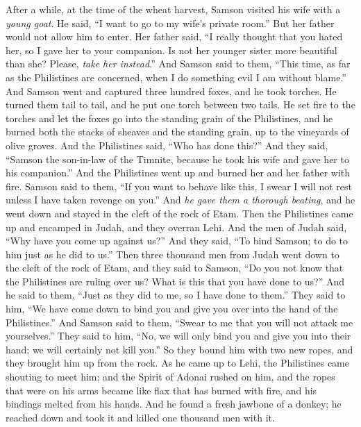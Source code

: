 \begin{biblechapter} %
 After a while, at the time of the wheat harvest, Samson visited his wife with a \textit{young goat}. He said, “I want to go to my wife’s private room.” But her father would not allow him to enter.
\verse Her father said, “I really thought that you hated her, so I gave her to your companion. Is not her younger sister more beautiful than she? Please, \textit{take her instead}.”
\verse And Samson said to them, “This time, as far as the Philistines are concerned, when I do something evil I am without blame.”
\verse And Samson went and captured three hundred foxes, and he took torches. He turned them tail to tail, and he put one torch between two tails.
\verse He set fire to the torches and let the foxes go into the standing grain of the Philistines, and he burned both the stacks of sheaves and the standing grain, up to the vineyards of olive groves.
\verse And the Philistines said, “Who has done this?” And they said, “Samson the son-in-law of the Timnite, because he took his wife and gave her to his companion.” And the Philistines went up and burned her and her father with fire.
\verse Samson said to them, “If you want to behave like this, I swear I will not rest unless I have taken revenge on you.”
\verse And \textit{he gave them a thorough beating}, and he went down and stayed in the cleft of the rock of Etam.
\verse Then the Philistines came up and encamped in Judah, and they overran Lehi.
\verse And the men of Judah said, “Why have you come up against us?” And they said, “To bind Samson; to do to him just as he did to us.”
\verse Then three thousand men from Judah went down to the cleft of the rock of Etam, and they said to Samson, “Do you not know that the Philistines are ruling over us? What is this that you have done to us?” And he said to them, “Just as they did to me, so I have done to them.”
\verse They said to him, “We have come down to bind you and give you over into the hand of the Philistines.” And Samson said to them, “Swear to me that you will not attack me yourselves.”
\verse They said to him, “No, we will only bind you and give you into their hand; we will certainly not kill you.” So they bound him with two new ropes, and they brought him up from the rock.
\verse As he came up to Lehi, the Philistines came shouting to meet him; and the Spirit of Adonai rushed on him, and the ropes that were on his arms became like flax that has burned with fire, and his bindings melted from his hands.
\verse And he found a fresh jawbone of a donkey; he reached down and took it and killed one thousand men with it.

\end{biblechapter}
